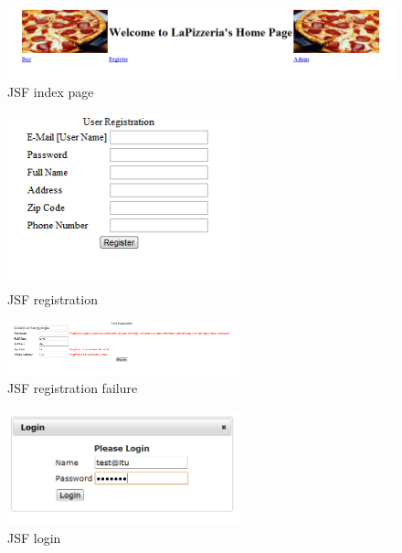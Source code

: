 \begin{figure}[H]
    \begin{center}
        \includegraphics[width=\textwidth]{fig/jsf_index.png}
        \caption{JSF index page}
        \label{fig.jsp_index}
    \end{center}
\end{figure}

\begin{figure}[H]
    \begin{center}
        \includegraphics[width=0.6\textwidth]{fig/jsf_reg.png}
        \caption{JSF registration}
        \label{fig.jsp_index}
    \end{center}
\end{figure}

\begin{figure}[H]
    \begin{center}
        \includegraphics[width=0.6\textwidth]{fig/jsf_reg_fail.png}
        \caption{JSF registration failure}
        \label{fig.jsp_index}
    \end{center}
\end{figure}

\begin{figure}[H]
    \begin{center}
        \includegraphics[width=0.6\textwidth]{fig/jsf_login.png}
        \caption{JSF login}
        \label{fig.jsp_index}
    \end{center}
\end{figure}

